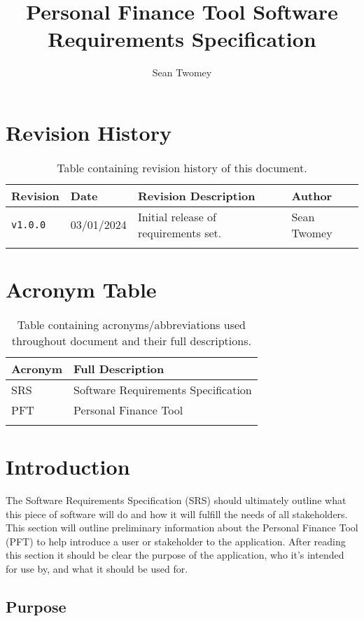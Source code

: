 \documentclass{article}
\title{Personal Finance Tool Software Requirements Specification}
\author{Sean Twomey}
\begin{document}
\maketitle
\tableofcontents
\newpage

\section{Revision History}

\begin{longtable}{|p{2cm}|p{2cm}|p{5cm}|p{3cm}|}
    \hline
    \textbf{Revision} & \textbf{Date} & \textbf{Revision Description} & \textbf{Author} \\
    \hline
    \texttt{v1.0.0} & 03/01/2024 & Initial release of requirements set. & Sean Twomey \\
    \hline
    \caption{Table containing revision history of this document.}
\end{longtable}

\section{Acronym Table}

\begin{longtable}{|p{2cm}|p{10cm}|}
    \hline
    \textbf{Acronym} & \textbf{Full Description} \\
    \hline
    SRS & Software Requirements Specification \\
    \hline
    PFT & Personal Finance Tool \\
    \hline
    \caption{Table containing acronyms/abbreviations used throughout document and their full descriptions.}
\end{longtable}


\section{Introduction}

The Software Requirements Specification (SRS) should ultimately outline what this piece of software will do and how it will fulfill the needs of all stakeholders. This section will outline preliminary information about the Personal Finance Tool (PFT) to help introduce a user or stakeholder to the application. After
reading this section it should be clear the purpose of the application, who it's intended for use by, and what it should be used for.

\subsection{Purpose}
\end{document}
